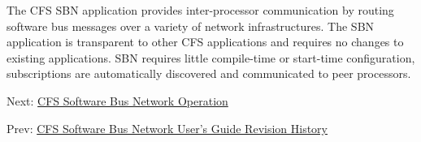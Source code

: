 The C\-F\-S S\-B\-N application provides inter-\/processor communication by routing software bus messages over a variety of network infrastructures. The S\-B\-N application is transparent to other C\-F\-S applications and requires no changes to existing applications. S\-B\-N requires little compile-\/time or start-\/time configuration, subscriptions are automatically discovered and communicated to peer processors.

Next\-: \hyperlink{cfssbnopr}{C\-F\-S Software Bus Network Operation} \par
 Prev\-: \hyperlink{cfssbnrevhist}{C\-F\-S Software Bus Network User's Guide Revision History} 
